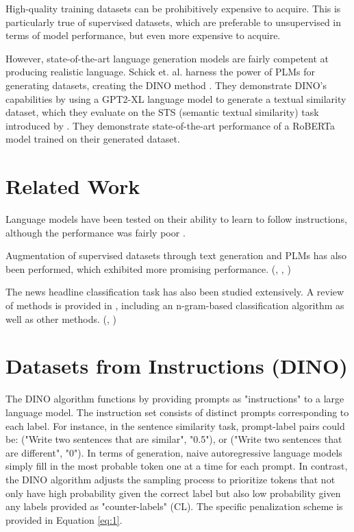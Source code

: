 \documentclass[11pt]{article}
\begin{document}
High-quality training datasets can be prohibitively expensive to acquire. This is particularly true of supervised datasets, which are preferable to unsupervised in terms of model performance, but even more expensive to acquire.

However, state-of-the-art language generation models are fairly competent at producing realistic language. Schick et. al. harness the power of PLMs for generating datasets, creating the DINO method \citep{schick2021generating}. They demonstrate DINO's capabilities by using a GPT2-XL language model to generate a textual similarity dataset, which they evaluate on the STS (semantic textual similarity) task introduced by \citet{agirre2012semeval}. They demonstrate state-of-the-art performance of a RoBERTa model trained on their generated dataset.


\section{Related Work}

Language models have been tested on their ability to learn to follow instructions, although the performance was fairly poor \citep{efrat2020turking}.

Augmentation of supervised datasets through text generation and PLMs has also been performed, which exhibited more promising performance. (\citet{anabytavor2019data}, \citet{Yang_2020}, \citet{mohapatra2021simulated})

The news headline classification task has also been studied extensively. A review of methods is provided in \citet{7097339}, including an n-gram-based classification algorithm as well as other methods. (\citet{6308980}, \citet{classification-short})


\section{Datasets from Instructions (DINO)}

The DINO algorithm functions by providing prompts as "instructions" to a large language model. The instruction set consists of distinct prompts corresponding to each label. For instance, in the sentence similarity task, prompt-label pairs could be: ("Write two sentences that are similar", "0.5"), or ("Write two sentences that are different", "0"). In terms of generation, naive autoregressive language models simply fill in the most probable token one at a time for each prompt. In contrast, the DINO algorithm adjusts the sampling process to prioritize tokens that not only have high probability given the correct label but also low probability given any labels provided as "counter-labels" (CL). The specific penalization scheme is provided in Equation \ref{eq:1}. 
\end{document}
